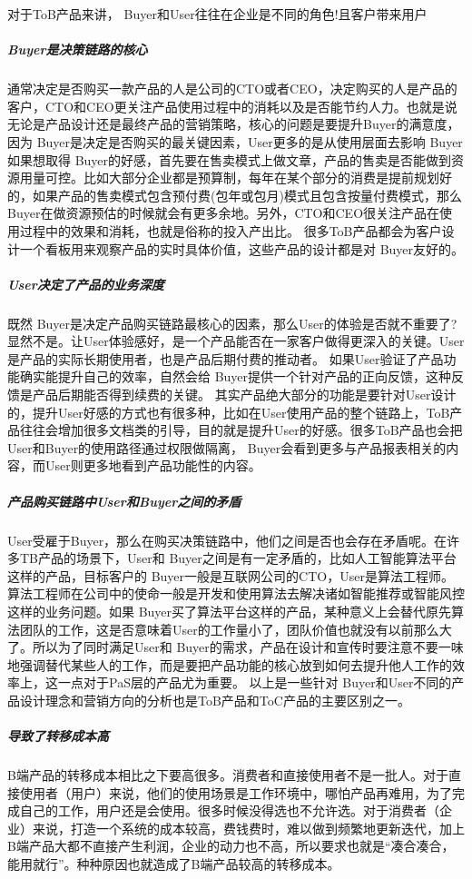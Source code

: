 \documentclass[letterpaper,11pt,english]{sphinxmanual}
\begin{document}
对于ToB产品来讲， Buyer和User往往在企业是不同的角色!且客户带来用户


\subparagraph{Buyer是决策链路的核心}
\label{\detokenize{chapter_introduction/2B:buyer}}
通常决定是否购买一款产品的人是公司的CTO或者CEO，决定购买的人是产品的客户，CTO和CEO更关注产品使用过程中的消耗以及是否能节约人力。也就是说无论是产品设计还是最终产品的营销策略，核心的问题是要提升Buyer的满意度，因为
Buyer是决定是否购买的最关键因素，User更多的是从使用层面去影响
Buyer如果想取得
Buyer的好感，首先要在售卖模式上做文章，产品的售卖是否能做到资源用量可控。比如大部分企业都是预算制，每年在某个部分的消费是提前规划好的，如果产品的售卖模式包含预付费(包年或包月)模式且包含按量付费模式，那么
Buyer在做资源预估的时候就会有更多余地。另外，CTO和CEO很关注产品在使用过程中的效果和消耗，也就是俗称的投入产出比。
很多ToB产品都会为客户设计一个看板用来观察产品的实时具体价值，这些产品的设计都是对
Buyer友好的。


\subparagraph{User决定了产品的业务深度}
\label{\detokenize{chapter_introduction/2B:user}}
既然
Buyer是决定产品购买链路最核心的因素，那么User的体验是否就不重要了?显然不是。让User体验感好，是一个产品能否在一家客户做得更深入的关键。User是产品的实际长期使用者，也是产品后期付费的推动者。
如果User验证了产品功能确实能提升自己的效率，自然会给
Buyer提供一个针对产品的正向反馈，这种反馈是产品后期能否得到续费的关键。
其实产品绝大部分的功能是要针对User设计的，提升User好感的方式也有很多种，比如在User使用产品的整个链路上，ToB产品往往会增加很多文档类的引导，目的就是提升User的好感。很多ToB产品也会把User和Buyer的使用路径通过权限做隔离，
Buyer会看到更多与产品报表相关的内容，而User则更多地看到产品功能性的内容。


\subparagraph{产品购买链路中User和Buyer之间的矛盾}
\label{\detokenize{chapter_introduction/2B:userbuyer}}
User受雇于Buyer，那么在购买决策链路中，他们之间是否也会存在矛盾呢。在许多TB产品的场景下，User和
Buyer之间是有一定矛盾的，比如人工智能算法平台这样的产品，目标客户的
Buyer一般是互联网公司的CTO，User是算法工程师。算法工程师在公司中的使命一般是开发和使用算法去解决诸如智能推荐或智能风控这样的业务问题。如果
Buyer买了算法平台这样的产品，某种意义上会替代原先算法团队的工作，这是否意味着User的工作量小了，团队价值也就没有以前那么大了。所以为了同时满足User和
Buyer的需求，产品在设计和宣传时要注意不要一味地强调替代某些人的工作，而是要把产品功能的核心放到如何去提升他人工作的效率上，这一点对于PaS层的产品尤为重要。
以上是一些针对
Buyer和User不同的产品设计理念和营销方向的分析也是ToB产品和ToC产品的主要区别之一。


\subparagraph{导致了转移成本高}
\label{\detokenize{chapter_introduction/2B:id29}}
B端产品的转移成本相比之下要高很多。消费者和直接使用者不是一批人。对于直接使用者（用户）来说，他们的使用场景是工作环境中，哪怕产品再难用，为了完成自己的工作，用户还是会使用。很多时候没得选也不允许选。对于消费者（企业）来说，打造一个系统的成本较高，费钱费时，难以做到频繁地更新迭代，加上B端产品大都不直接产生利润，企业的动力也不高，所以要求也就是“凑合凑合，能用就行”。种种原因也就造成了B端产品较高的转移成本。%
\begin{footnote}[60]\sphinxAtStartFootnote
{}
%
\end{footnote}
\end{document}
